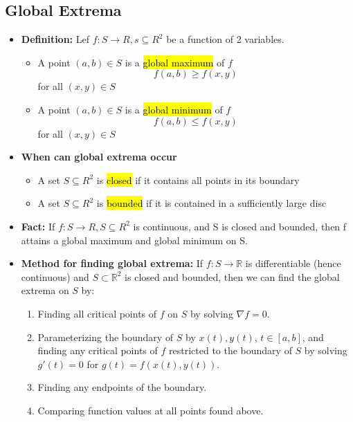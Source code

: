 \documentclass{article}
\begin{document}
  \subsection*{Global Extrema}
  \begin{itemize}
    \item \textbf{Definition:} Lef $f:S \rightarrow R, s \subseteq R^2$ be a function of 2 variables. 
    \begin{itemize}
      \item A point $(a,b) \in S$ is a \hl{global maximum} of $f$
      $$
        f(a,b) \geq f(x,y)
      $$ 
      for all $(x,y) \in S$

      \item A point $(a,b) \in S$ is a \hl{global minimum} of $f$
      $$
        f(a,b) \leq f(x,y)
      $$ 
      for all $(x,y) \in S$
    \end{itemize}

    \item \textbf{When can global extrema occur}
    \begin{itemize}
      \item A set $S \subseteq R^2$ is \hl{closed} if it contains all points in its boundary
      \item A set $S \subseteq R^2$ is \hl{bounded} if it is contained in a sufficiently large disc
    \end{itemize}

    \item \textbf{Fact:} If $f: S \rightarrow R, S \subseteq R^2$ is continuous, and S is closed and bounded, then f attains a global maximum and global minimum on S.

    \item \textbf{Method for finding global extrema:} If \( f: S \to \mathbb{R} \) is differentiable (hence continuous) and \( S \subset \mathbb{R}^2 \) is closed and bounded, then we can find the global extrema on \( S \) by:

    \begin{enumerate}
        \item Finding all critical points of \( f \) on \( S \) by solving \( \nabla f = 0 \).
        
        \item Parameterizing the boundary of \( S \) by \( x(t), y(t) \), \( t \in [a, b] \), and finding any critical points of \( f \) restricted to the boundary of \( S \) by solving \( g'(t) = 0 \) for \( g(t) = f(x(t), y(t)) \).
        
        \item Finding any endpoints of the boundary.
        
        \item Comparing function values at all points found above.
    \end{enumerate}

  \end{itemize}
\end{document}
